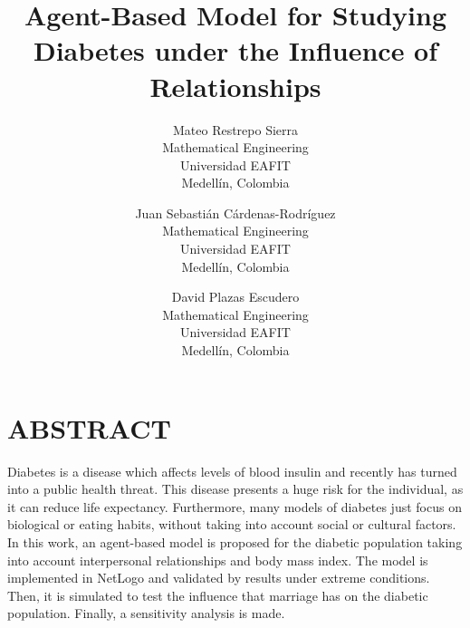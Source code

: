 \documentclass{wscpaperproc}
\theoremstyle{wsc}
\begin{document}
%
%

\title{Agent-Based Model for Studying Diabetes under the Influence of Relationships}

\author{Mateo Restrepo Sierra\\ [12pt]
Mathematical Engineering\\
Universidad EAFIT\\
Medell\'in, Colombia\\
\and
Juan Sebasti\'an C\'ardenas-Rodr\'iguez \\[12pt]
Mathematical Engineering\\
Universidad EAFIT\\
Medell\'in, Colombia\\
\and
David Plazas Escudero\\ [12pt]
Mathematical Engineering\\
Universidad EAFIT\\
Medell\'in, Colombia
}






\maketitle

\section*{ABSTRACT}
Diabetes is a disease which affects levels of blood insulin and recently has turned into a public health threat. This disease presents a huge risk for the individual, as it can reduce life expectancy. Furthermore, many models of diabetes just focus on biological or eating habits, without taking into account social or cultural factors. In this work, an agent-based model is proposed for the diabetic population taking into account interpersonal relationships and body mass index. The model is implemented in NetLogo and validated by results under extreme conditions. Then, it is simulated to test the influence that marriage has on the diabetic population.  Finally, a sensitivity analysis is made. 
















\end{document}
